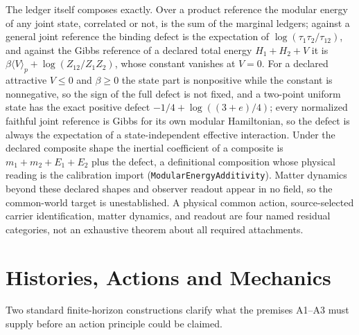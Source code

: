 \documentclass[11pt]{article}
\begin{document}
The ledger itself composes exactly. Over a product reference the modular
energy of any joint state, correlated or not, is the sum of the marginal
ledgers; against a general joint reference the binding defect is the
expectation of \(\log(\tau_1\tau_2/\tau_{12})\), and against the Gibbs
reference of a declared total energy \(H_1+H_2+V\) it is
\(\beta\langle V\rangle_p+\log(Z_{12}/Z_1Z_2)\), whose constant vanishes at
\(V=0\). For a declared attractive \(V\le0\) and \(\beta\ge0\) the state
part is nonpositive while the constant is nonnegative, so the sign of the
full defect is not fixed, and a two-point uniform state has the exact
positive defect \(-1/4+\log((3+e)/4)\); every normalized faithful joint
reference is Gibbs for its own modular Hamiltonian, so the defect is always
the expectation of a state-independent effective interaction. Under the
declared composite shape the inertial coefficient of a composite is
\(m_1+m_2+E_1+E_2\) plus the defect, a definitional composition whose
physical reading is the calibration import
(\texttt{ModularEnergyAdditivity}).
Matter dynamics beyond these declared shapes and observer readout appear
in no field, so the common-world target is unestablished. A physical common action, source-selected carrier
identification, matter dynamics, and readout are four named residual
categories, not an exhaustive theorem about all required attachments.

\section{Histories, Actions and Mechanics}
\label{sec:history-variational-boundary}

Two standard finite-horizon constructions clarify what the premises A1--A3
must supply before an action principle could be claimed.
\end{document}
